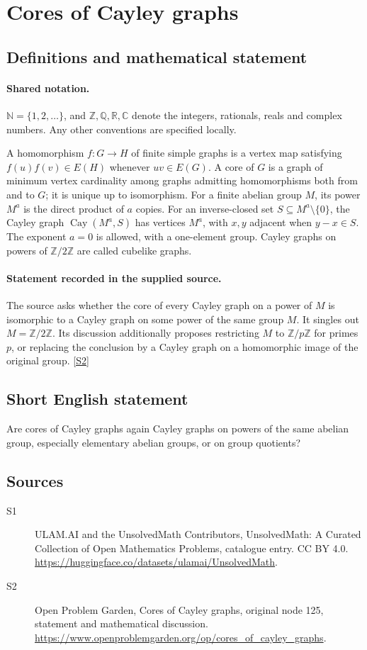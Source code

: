 \documentclass[11pt]{article}
\newcommand{\sref}[2]{\hyperlink{source:#1:#2}{[S#2]}}
\begin{document}
\section{Cores of Cayley graphs}\label{statement}

\subsection{Definitions and mathematical statement}

\paragraph{Shared notation.}$\mathbb N=\{1,2,\ldots\}$, and $\mathbb Z,\mathbb Q,\mathbb R,\mathbb C$ denote the integers, rationals, reals and complex numbers. Any other conventions are specified locally.


A homomorphism $f:G\to H$ of finite simple graphs is a vertex map satisfying $f(u)f(v)\in E(H)$ whenever $uv\in E(G)$. A core of $G$ is a graph of minimum vertex cardinality among graphs admitting homomorphisms both from and to $G$; it is unique up to isomorphism. For a finite abelian group $M$, its power $M^a$ is the direct product of $a$ copies. For an inverse-closed set $S\subseteq M^a\setminus\{0\}$, the Cayley graph $\operatorname{Cay}(M^a,S)$ has vertices $M^a$, with $x,y$ adjacent when $y-x\in S$. The exponent $a=0$ is allowed, with a one-element group. Cayley graphs on powers of $\mathbb Z/2\mathbb Z$ are called cubelike graphs.
\paragraph{Statement recorded in the supplied source.}
The source asks whether the core of every Cayley graph on a power of $M$ is isomorphic to a Cayley graph on some power of the same group $M$. It singles out $M=\mathbb Z/2\mathbb Z$. Its discussion additionally proposes restricting $M$ to $\mathbb Z/p\mathbb Z$ for primes $p$, or replacing the conclusion by a Cayley graph on a homomorphic image of the original group. \sref{statement}{2}
\subsection{Short English statement}
Are cores of Cayley graphs again Cayley graphs on powers of the same abelian group, especially elementary abelian groups, or on group quotients?
\subsection{Sources}
\begin{description}
\item[\hypertarget{source:statement:1}{S1}] ULAM.AI and the UnsolvedMath Contributors, UnsolvedMath: A Curated Collection of Open Mathematics Problems, catalogue entry. CC BY 4.0. \url{https://huggingface.co/datasets/ulamai/UnsolvedMath}.
\item[\hypertarget{source:statement:2}{S2}] Open Problem Garden, Cores of Cayley graphs, original node 125, statement and mathematical discussion. \url{https://www.openproblemgarden.org/op/cores_of_cayley_graphs}.
\end{description}
\label{end:statement}
\end{document}
